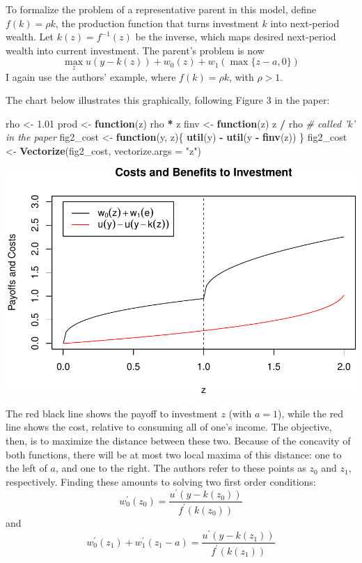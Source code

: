 \documentclass[]{article}
\newenvironment{Shaded}{\begin{snugshade}}{\end{snugshade}}
\newcommand{\KeywordTok}[1]{\textcolor[rgb]{0.13,0.29,0.53}{\textbf{#1}}}
\newcommand{\DataTypeTok}[1]{\textcolor[rgb]{0.13,0.29,0.53}{#1}}
\newcommand{\FloatTok}[1]{\textcolor[rgb]{0.00,0.00,0.81}{#1}}
\newcommand{\StringTok}[1]{\textcolor[rgb]{0.31,0.60,0.02}{#1}}
\newcommand{\CommentTok}[1]{\textcolor[rgb]{0.56,0.35,0.01}{\textit{#1}}}
\newcommand{\ControlFlowTok}[1]{\textcolor[rgb]{0.13,0.29,0.53}{\textbf{#1}}}
\newcommand{\OperatorTok}[1]{\textcolor[rgb]{0.81,0.36,0.00}{\textbf{#1}}}
\newcommand{\NormalTok}[1]{#1}
\begin{document}
To formalize the problem of a representative parent in this model,
define \(f(k) = \rho k\), the production function that turns investment
\(k\) into next-period wealth. Let \(k(z) = f^{-1}(z)\) be the inverse,
which maps desired next-period wealth into current investment. The
parent's problem is now
\[\max_z u(y - k(z)) + w_0(z) + w_1(\max\{z - a, 0\})\] I again use the
authors' example, where \(f(k) = \rho k\), with \(\rho > 1\).

The chart below illustrates this graphically, following Figure 3 in the
paper:

\begin{Shaded}
\begin{Highlighting}[]
\NormalTok{rho <-}\StringTok{ }\FloatTok{1.01}
\NormalTok{prod <-}\StringTok{ }\ControlFlowTok{function}\NormalTok{(z) rho }\OperatorTok{*}\StringTok{ }\NormalTok{z}
\NormalTok{finv <-}\StringTok{ }\ControlFlowTok{function}\NormalTok{(z) z }\OperatorTok{/}\StringTok{ }\NormalTok{rho }\CommentTok{# called 'k' in the paper}
\NormalTok{fig2_cost <-}\StringTok{ }\ControlFlowTok{function}\NormalTok{(y, z)\{}
  \KeywordTok{util}\NormalTok{(y) }\OperatorTok{-}\StringTok{ }\KeywordTok{util}\NormalTok{(y }\OperatorTok{-}\StringTok{ }\KeywordTok{finv}\NormalTok{(z))}
\NormalTok{\}}
\NormalTok{fig2_cost <-}\StringTok{ }\KeywordTok{Vectorize}\NormalTok{(fig2_cost, }\DataTypeTok{vectorize.args =} \StringTok{"z"}\NormalTok{)}
\end{Highlighting}
\end{Shaded}

\includegraphics{genicot_ray_notes_files/figure-latex/unnamed-chunk-2-1.pdf}

The red black line shows the payoff to investment \(z\) (with \(a= 1\)),
while the red line shows the cost, relative to consuming all of one's
income. The objective, then, is to maximize the distance between these
two. Because of the concavity of both functions, there will be at most
two local maxima of this distance: one to the left of \(a\), and one to
the right. The authors refer to these points as \(z_0\) and \(z_1\),
respectively. Finding these amounts to solving two first order
conditions:
\[w_0^\prime(z_0) = \frac{u^\prime(y - k(z_0))}{f^\prime(k(z_0))}\] and
\[w_0^\prime(z_1) + w_1^\prime(z_1 - a) = \frac{u^\prime(y - k(z_1))}{f^\prime(k(z_1))}\]
\end{document}

